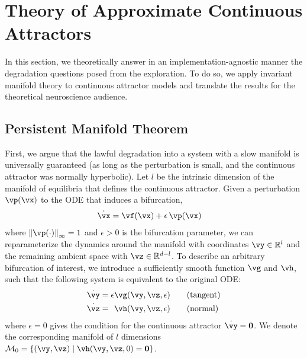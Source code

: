 \documentclass{article} %
\newcounter{ct}
\newcommand{\reals}{\mathbb{R}}
\newcommand{\manifold}{\mathcal{M}}
\newcommand{\uniformNorm}[1]{\left\|#1\right\|_\infty} %
\theoremstyle{definition}
\theoremstyle{remark}
\begin{document}
\section{Theory of Approximate Continuous Attractors}\label{sec:theory}
In this section, we theoretically answer in an implementation-agnostic manner the degradation questions posed from the exploration.
To do so, we apply invariant manifold theory to continuous attractor models and translate the results for the theoretical neuroscience audience.
\subsection{Persistent Manifold Theorem}\label{sec:imt}
First, we argue that the lawful degradation into a system with a slow manifold is universally guaranteed (as long as the perturbation is small, and the continuous attractor was normally hyperbolic).
Let \(l\) be the intrinsic dimension of the manifold of equilibria that defines the continuous attractor.
Given a perturbation \(\vp(\vx)\) to the ODE that induces a bifurcation,
\begin{align}\label{eq:perturbation:nonparam}
	\dot{\vx} &= \vf(\vx) + \epsilon\,\vp(\vx)
\end{align}where \(\uniformNorm{\vp(\cdot)} = 1\) and \(\epsilon > 0\) is the bifurcation parameter,
we can reparameterize the dynamics around the manifold with coordinates \(\vy \in \reals^{l}\) and the remaining ambient space with \(\vz \in \reals^{d - l}\).
To describe an arbitrary bifurcation of interest, we introduce a sufficiently smooth function \(\vg\) and \(\vh\), such that the following system is equivalent to the original ODE:
\begin{align}
    \dot{\vy} &=           \epsilon  \vg(\vy, \vz, \epsilon) \qquad \text{(tangent)}\label{eq:fenichel:flowtangent}\\
    \dot{\vz} &= \hphantom{\epsilon} \vh(\vy, \vz, \epsilon) \qquad \text{(normal)}\label{eq:fenichel:flownormal}
\end{align}where \(\epsilon = 0\) gives the condition for the continuous attractor \(\dot{\vy} = \mathbf{0}\).
We denote the corresponding manifold of \(l\) dimensions \(\manifold_{0} = \{(\vy,\vz) \mid \vh(\vy,\vz, 0) = \mathbf{0} \}\).
\end{document}

